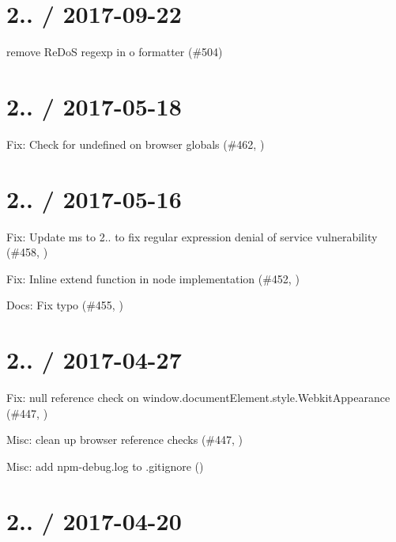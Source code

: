 \section*{2.. / 2017-\/09-\/22 }


\begin{DoxyItemize}
\item remove Re\+DoS regexp in o formatter (\#504)
\end{DoxyItemize}

\section*{2.. / 2017-\/05-\/18 }


\begin{DoxyItemize}
\item Fix\+: Check for undefined on browser globals (\#462, )
\end{DoxyItemize}

\section*{2.. / 2017-\/05-\/16 }


\begin{DoxyItemize}
\item Fix\+: Update ms to 2.. to fix regular expression denial of service vulnerability (\#458, )
\item Fix\+: Inline extend function in node implementation (\#452, )
\item Docs\+: Fix typo (\#455, )
\end{DoxyItemize}

\section*{2.. / 2017-\/04-\/27 }


\begin{DoxyItemize}
\item Fix\+: null reference check on window.\+document\+Element.\+style.\+Webkit\+Appearance (\#447, )
\item Misc\+: clean up browser reference checks (\#447, )
\item Misc\+: add npm-\/debug.\+log to .gitignore ()
\end{DoxyItemize}

\section*{2.. / 2017-\/04-\/20 }



